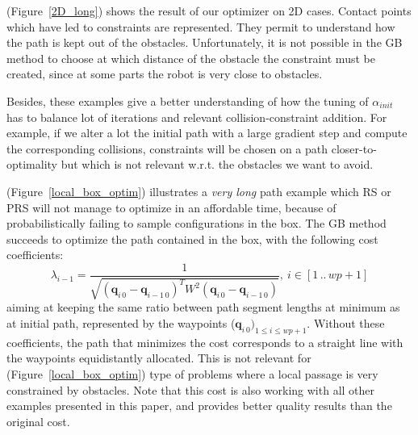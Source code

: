 \documentclass{tADR2e}
\newcommand\conf{\mathbf{q}}
\newcommand\weight{W}
\begin{document}
(Figure~\ref{2D_long}) shows the result of our optimizer on 2D cases. Contact points which have 
led to constraints are represented. They permit to understand how the path is kept out of the obstacles. 
Unfortunately, it is not possible in the GB method to choose at which distance of the obstacle 
the constraint must be created, since at some parts the robot is very close to obstacles.

Besides, these examples give a better understanding of how the tuning of 
$\alpha_{init}$ 
has to balance lot of iterations and relevant collision-constraint addition. For 
example, if we alter a lot the initial path with a large gradient step and 
compute the corresponding collisions, constraints will be chosen on a 
path closer-to-optimality but which is not relevant
w.r.t. the obstacles we want to avoid.

(Figure~\ref{local_box_optim}) illustrates a \textit{very long} path example which RS 
or PRS will not manage to 
optimize in an affordable time, because of probabilistically failing to sample 
configurations in the box. The GB method succeeds to optimize the 
path contained in the box, with the following cost coefficients:
$$
\lambda_{i-1} = \frac{1}{\sqrt{(\conf_{i\,0}-\conf_{i-1\,0})^T \weight^2 
(\conf_{i\,0}-\conf_{i-1\,0})}}, \  i \in [1\,..\, wp+1]  
$$
aiming at keeping the same ratio between path segment lengths at 
minimum as at 
initial path, represented by the waypoints ($\conf_{i\,0})_{1\leq i\leq wp+1}$.
Without these coefficients, the path that minimizes the cost corresponds to a 
straight line with the waypoints equidistantly allocated. This is not relevant for 
(Figure~\ref{local_box_optim}) type of problems where a local passage is very
constrained by obstacles. Note that this cost is also working with all other 
examples presented in this paper, and provides better quality results than the original cost.
\end{document}
